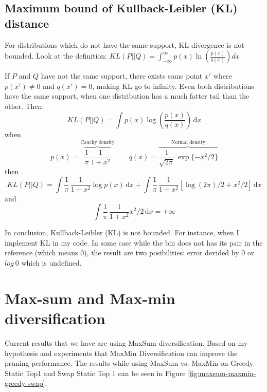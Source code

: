 \documentclass{article}
\begin{document}



\subsection{Maximum bound of Kullback-Leibler (KL) distance}

For distributions which do not have the same support, KL divergence is not bounded. Look at the definition: $KL(P\vert\vert Q) = \int_{-\infty}^{\infty} p(x)\ln\left(\frac{p(x)}{q(x)}\right) dx$

If $ P $ and $ Q $ have not the same support, there exists some point $x'$ where $p(x') \neq 0$ and $q(x') = 0$, making KL go to infinity. Even both distributions have the same support, when one distribution has a much fatter tail than the other. Then:
$$KL(P\vert\vert Q) = \int p(x)\log\left(\frac{p(x)}{q(x)}\right) \,\text{d}x$$
when
$$p(x)=\overbrace{\frac{1}{\pi}\,\frac{1}{1+x^2}}^\text{Cauchy density}\qquad q(x)=\overbrace{\frac{1}{\sqrt{2\pi}}\,\exp\{-x^2/2\}}^\text{Normal density}$$
then
$$KL(P\vert\vert Q) = \int \frac{1}{\pi}\,\frac{1}{1+x^2} \log p(x) \,\text{d}x + \int \frac{1}{\pi}\,\frac{1}{1+x^2} [\log(2\pi)/2+x^2/2]\,\text{d}x$$
and
$$\int \frac{1}{\pi}\,\frac{1}{1+x^2} x^2/2\,\text{d}x=+\infty$$

In conclusion, Kullback-Leibler (KL) is not bounded. For instance, when I implement KL in my code. In some case while the bin does not has its pair in the reference (which means 0), the result are two posibilities: error devided by 0 or $ log\ 0 $ which is undefined. 
\newline

\section{Max-sum and Max-min diversification}
Current results that we have are using MaxSum diversification. Based on my hypothesis and experiments that MaxMin Diversification can improve the pruning performance. The results while using MaxSum vs. MaxMin on Greedy Static Top1 and Swap Static Top 1 can be seen in Figure \ref{fig:maxsum-maxmin-greedy-swap}.
\end{document}
